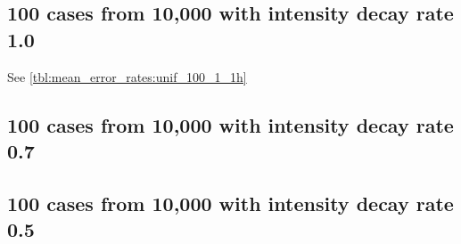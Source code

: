 \subsection{100 cases from 10,000 with intensity decay rate 1.0}

See \autoref{tbl:mean_error_rates:unif_100_1_1h}
\begin{table}[H]
\centering
\scriptsize

    \begin{subtable}{0.5\textwidth}
    
    \caption{Means} 
    \end{subtable}%
    \begin{subtable}{0.5\textwidth}
    
    \caption{Standard deviations} 
    \end{subtable}

\caption{Error rates for uniform population of 10,000, single peak intensity of factor 100 and decay rate 1.0}
\label{tbl:mean_error_rates:unif_100_1_1h:3}
\end{table}

\subsection{100 cases from 10,000 with intensity decay rate 0.7}
\begin{table}[H]
\centering
\scriptsize

    \begin{subtable}{0.5\textwidth}
    
    \caption{Means} 
    \end{subtable}%
    \begin{subtable}{0.5\textwidth}
    
    \caption{Standard deviations} 
    \end{subtable}

\caption{Error rates for uniform population of 10,000, single peak intensity of factor 100 and decay rate 0.7}
\label{tbl:mean_error_rates:unif_100_0.7_1h}
\end{table}

\subsection{100 cases from 10,000 with intensity decay rate 0.5}
\begin{table}[H]
\centering
\scriptsize

    \begin{subtable}{0.5\textwidth}
    
    \caption{Means} 
    \end{subtable}%
    \begin{subtable}{0.5\textwidth}
    
    \caption{Standard deviations} 
    \end{subtable}

\caption{Error rates for uniform population of 10,000, single peak intensity of factor 100 and decay rate 0.5}
\label{tbl:mean_error_rates:unif_100_0.5_1h}
\end{table}



